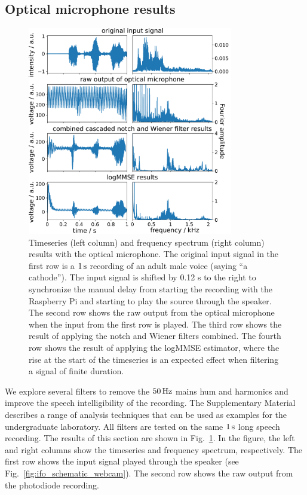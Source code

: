 \documentclass[paper-main.tex]{subfiles}
\begin{document}
\subsection{Optical microphone results}
\label{sec:opticalMicResults}

\begin{figure}
\begin{center}
\includegraphics[width=0.8\textwidth]{figures/combined_highlight_results_melatos_labelled.pdf}
\caption{\label{fig:notchWienerLogMMSEResults}
Timeseries (left column) and frequency spectrum (right column) results with the optical microphone. 
The original input signal in the first row is a $1\,{\rm s}$ recording of an adult male voice (saying ``a cathode''). 
 The input signal is shifted by 0.12 s to the right to synchronize the manual delay from starting the recording with the Raspberry Pi and starting to play the source through the speaker. 
The second row shows the raw output from the optical microphone when the input from the first row is played. 
The third row shows the result of applying the notch and Wiener filters combined. 
The fourth row shows the result of applying the logMMSE estimator, where the rise at the start of the timeseries is an expected effect when filtering a signal of finite duration. 
}
\end{center}
\end{figure}

We explore several filters to remove the $50\,{\rm Hz}$ mains hum and harmonics and improve the speech intelligibility of the recording.
The Supplementary Material describes a range of analysis techniques that can be used as examples for the undergraduate laboratory. 
All filters are tested on the same $1\,{\rm s}$ long speech recording.
The results of this section are shown in Fig.~\ref{fig:notchWienerLogMMSEResults}. 
In the figure, the left and right columns show the timeseries and frequency spectrum, respectively. 
The first row shows the input signal played through the speaker (see Fig.~\ref{fig:ifo_schematic_webcam}). 
The second row shows the raw output from the photodiode recording. 
\end{document}
